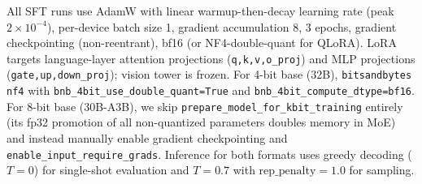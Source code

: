 \documentclass[11pt]{article}
\begin{document}
All SFT runs use AdamW with linear warmup-then-decay learning rate (peak $2{\times}10^{-4}$), per-device batch size 1, gradient accumulation 8, 3 epochs, gradient checkpointing (non-reentrant), bf16 (or NF4-double-quant for QLoRA). LoRA targets language-layer attention projections (\texttt{q,k,v,o\_proj}) and MLP projections (\texttt{gate,up,down\_proj}); vision tower is frozen. For 4-bit base (32B), \texttt{bitsandbytes} \texttt{nf4} with \texttt{bnb\_4bit\_use\_double\_quant=True} and \texttt{bnb\_4bit\_compute\_dtype=bf16}. For 8-bit base (30B-A3B), we skip \texttt{prepare\_model\_for\_kbit\_training} entirely (its fp32 promotion of all non-quantized parameters doubles memory in MoE) and instead manually enable gradient checkpointing and \texttt{enable\_input\_require\_grads}. Inference for both formats uses greedy decoding ($T{=}0$) for single-shot evaluation and $T{=}0.7$ with $\mathrm{rep\_penalty}{=}1.0$ for sampling.
\end{document}
